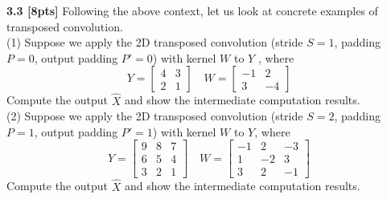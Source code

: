 \documentclass{article}
\begin{document}
\noindent
\textbf{3.3 [8pts]} Following the above context, let us look at concrete examples of transposed convolution. \\

\noindent
(1) Suppose we apply the 2D transposed convolution (stride $S = 1$, padding $P = 0$, output padding $P' = 0$) with kernel $W$ to $Y$ , where
\begin{equation}
    Y= 
    \begin{bmatrix}
        4&3\\
        2&1
    \end{bmatrix} 
    \quad W=
    \begin{bmatrix}
        -1&2\\
        3&-4
    \end{bmatrix} 
\end{equation}
Compute the output $\hat{X}$ and show the intermediate computation results.\\

\noindent
(2) Suppose we apply the 2D transposed convolution (stride $S = 2$, padding $P = 1$, output padding $P' = 1$) with kernel $W$ to $Y$, where
\begin{equation}
    Y= 
    \begin{bmatrix}
        9&8&7\\
        6&5&4\\
        3&2&1
    \end{bmatrix} 
    \quad W=
    \begin{bmatrix}
        -1&2&-3\\
        1&-2&3\\
        3&2&-1
    \end{bmatrix}
\end{equation}
Compute the output $\hat{X}$ and show the intermediate computation results.\\
\end{document}
